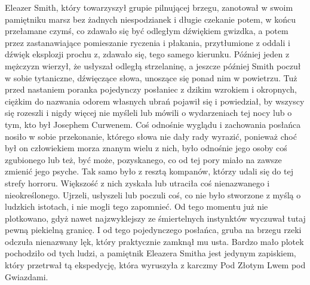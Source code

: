 Eleazer Smith, który towarzyszył grupie pilnującej brzegu, zanotował w swoim pamiętniku marsz bez żadnych niespodzianek i długie czekanie potem, w końcu przełamane czymś, co zdawało się być odległym dźwiękiem gwizdka, a potem przez zastanawiające pomieszanie ryczenia i płakania, przytłumione z oddali i dźwięk eksplozji prochu z, zdawało się, tego samego kierunku. Później jeden z mężczyzn wierzył, że usłyszał odległą strzelaninę, a jeszcze później Smith poczuł w sobie tytaniczne, dźwięczące słowa, unoszące się ponad nim w powietrzu. Tuż przed nastaniem poranka pojedynczy posłaniec z dzikim wzrokiem i okropnych, ciężkim do nazwania odorem własnych ubrań pojawił się i powiedział, by wszyscy się rozeszli i nigdy więcej nie myśleli lub mówili o wydarzeniach tej nocy lub o tym, kto był Josephem Curwenem. Coś odnośnie wyglądu i zachowania posłańca nosiło w sobie przekonanie, którego słowa nie dały rady wyrazić, ponieważ choć był on człowiekiem morza znanym wielu z nich, było odnośnie jego osoby coś zgubionego lub też, być może, pozyskanego, co od tej pory miało na zawsze zmienić jego psyche. Tak samo było z resztą kompanów, którzy udali się do tej strefy horroru. Większość z nich zyskała lub utraciła coś nienazwanego i nieokreślonego. Ujrzeli, usłyszeli lub poczuli coś, co nie było stworzone z myślą o ludzkich istotach, i nie mogli tego zapomnieć. Od tego momentu już nie plotkowano, gdyż nawet najzwyklejszy ze śmiertelnych instynktów wyczuwał tutaj pewną piekielną granicę. I od tego pojedynczego posłańca, gruba na brzegu rzeki odczuła nienazwany lęk, który praktycznie zamknął mu usta. Bardzo mało plotek pochodziło od tych ludzi, a pamiętnik Eleazera Smitha jest jedynym zapiskiem, który przetrwał tą ekspedycję, która wyruszyła z karczmy Pod Złotym Lwem pod Gwiazdami. 


